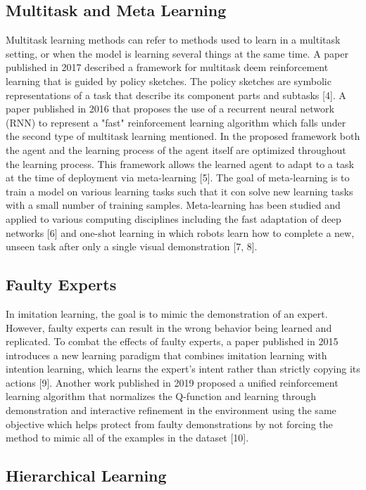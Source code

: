 \documentclass[letterpaper, 10 pt, conference]{ieeeconf}  %
\begin{document}
\subsection{Multitask and Meta Learning}

Multitask learning methods can refer to methods used to learn in a multitask setting, or when the model is learning several things at the same time. A paper published in 2017 described a framework for multitask deem reinforcement learning that is guided by policy sketches. The policy sketches are symbolic representations of a task that describe its component parts and subtasks [4]. A paper published in 2016 that proposes the use of a recurrent neural network (RNN) to represent a "fast" reinforcement learning algorithm which falls under the second type of multitask learning mentioned. In the proposed framework both the agent and the learning process of the agent itself are optimized throughout the learning process. This framework allows the learned agent to adapt to a task at the time of deployment via meta-learning [5].
\newline 
\indent The goal of meta-learning is to train a model on various learning tasks such that it con solve new learning tasks with a small number of training samples. Meta-learning has been studied and applied to various computing disciplines including the fast adaptation of deep networks [6] and one-shot learning in which robots learn how to complete a new, unseen task after only a single visual demonstration [7, 8]. 

\subsection{Faulty Experts}

In imitation learning, the goal is to mimic the demonstration of an expert. However, faulty experts can result in the wrong behavior being learned and replicated. To combat the effects of faulty experts, a paper published in 2015 introduces a new learning paradigm that combines imitation learning with intention learning, which learns the expert's intent rather than strictly copying its actions [9]. Another work published in 2019 proposed a unified reinforcement learning algorithm that normalizes the Q-function and learning through demonstration and interactive refinement in the environment using the same objective which helps protect from faulty demonstrations by not forcing the method to mimic all of the examples in the dataset [10].

\subsection{Hierarchical Learning}
\end{document}
